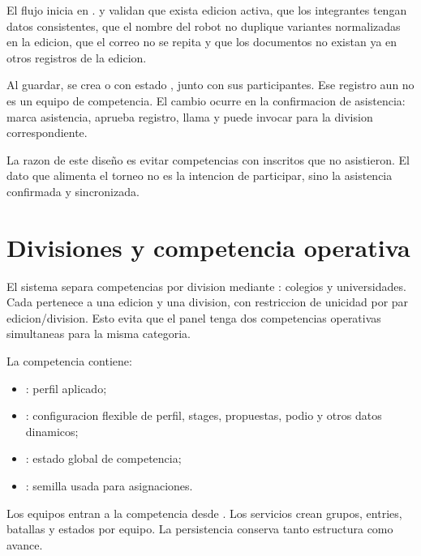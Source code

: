 El flujo inicia en .  y  validan que exista edicion activa, que los integrantes tengan datos consistentes, que el nombre del robot no duplique variantes normalizadas en la edicion, que el correo no se repita y que los documentos no existan ya en otros registros de la edicion.

Al guardar, se crea  o  con estado , junto con sus participantes. Ese registro aun no es un equipo de competencia. El cambio ocurre en la confirmacion de asistencia:  marca asistencia, aprueba registro, llama  y puede invocar  para la division correspondiente.

La razon de este diseño es evitar competencias con inscritos que no asistieron. El dato que alimenta el torneo no es la intencion de participar, sino la asistencia confirmada y sincronizada.

\section{Divisiones y competencia operativa}
\label{sec:flujo-divisiones}

El sistema separa competencias por division mediante : colegios y universidades. Cada  pertenece a una edicion y una division, con restriccion de unicidad por par edicion/division. Esto evita que el panel tenga dos competencias operativas simultaneas para la misma categoria.

La competencia contiene:

\begin{itemize}
  \item {}: perfil aplicado;
  \item {}: configuracion flexible de perfil, stages, propuestas, podio y otros datos dinamicos;
  \item {}: estado global de competencia;
  \item {}: semilla usada para asignaciones.
\end{itemize}

Los equipos entran a la competencia desde . Los servicios crean grupos, entries, batallas y estados por equipo. La persistencia conserva tanto estructura como avance.

